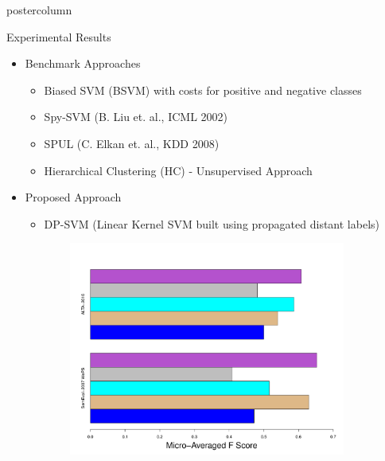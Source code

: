 \documentclass{beamer}
\begin{document}
\begin{frame}
\begin{columns}
\begin{column}{.5\textwidth}
\begin{beamercolorbox}[center]{postercolumn}
\begin{minipage}{.98\textwidth}
{                        \begin{block}{Experimental Results}
    \begin{itemize}
              \item Benchmark Approaches
                \begin{itemize}
                \item {\color{blue} Biased SVM (BSVM)} with costs for positive and negative classes
                \item {\color{brown} Spy-SVM} (B. Liu et. al., ICML 2002)
		\item {\color{cyan} SPUL} (C. Elkan et. al., KDD 2008)
                \item {\color{gray}Hierarchical Clustering (HC)} - Unsupervised Approach
              \end{itemize}
	      \item Proposed Approach
                \begin{itemize}
\item {\color{violet} DP-SVM} (Linear Kernel SVM built using propagated distant labels)
              \end{itemize}
     \end{itemize}
              \begin{figure}
                \footnotesize
                \centering
        \begin{figure}
							\begin{minipage}{1.22\textwidth}
								\centering\includegraphics[height=0.5\textwidth,width=1.25\textwidth,keepaspectratio]{img/ResultsWWW3.pdf}
							\end{minipage}
						\end{figure}

\end{figure}
\end{block}}
\end{minipage}
\end{beamercolorbox}
\end{column}
\end{columns}
\end{frame}
\end{document}
